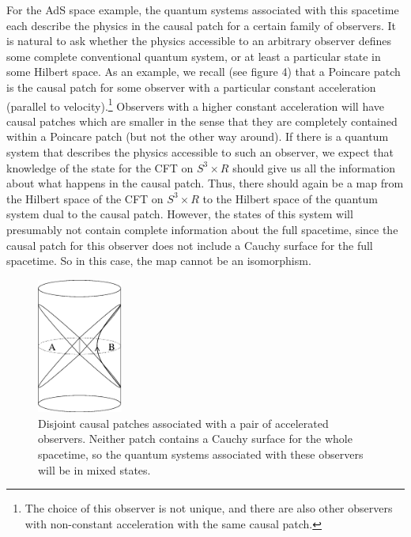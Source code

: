 \documentclass[12pt,epsf]{article}
\renewcommand{\(}{\left(}
\renewcommand{\)}{\right)}
\begin{document}
For the AdS space example, the quantum systems associated with this spacetime each describe the physics in the causal patch for a certain family of observers. It is natural to ask whether the physics accessible to an arbitrary observer defines some complete conventional quantum system, or at least a particular state in some Hilbert space. As an example, we recall (see figure 4) that a Poincare patch is the causal patch for some observer with a particular constant acceleration (parallel to velocity).\footnote{The choice of this observer is not unique, and there are also other observers with non-constant acceleration with the same causal patch.} Observers with a higher constant acceleration will have causal patches which are smaller in the sense that they are completely contained within a Poincare patch (but not the other way around). If there is a quantum system that describes the physics accessible to such an observer, we expect that knowledge of the state for the CFT on $S^3 \times R$ should give us all the information about what happens in the causal patch. Thus, there should again be a map from the Hilbert space of the CFT on $S^3 \times R$ to the Hilbert space of the quantum system dual to the causal patch. However, the states of this system will presumably not contain complete information about the full spacetime, since the causal patch for this observer does not include a Cauchy surface for the full spacetime. So in this case, the map cannot be an isomorphism.

\begin{figure}
\centering
\includegraphics[width=0.25\textwidth]{wedges.eps}
\caption{Disjoint causal patches associated with a pair of accelerated observers. Neither patch contains a Cauchy surface for the whole spacetime, so the quantum systems associated with these observers will be in mixed states.}
\end{figure}
\end{document}
